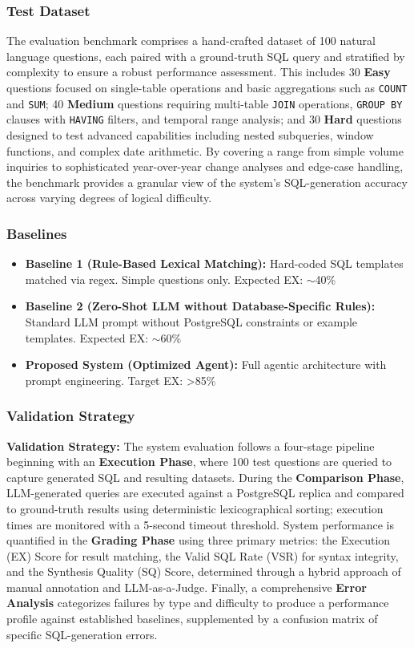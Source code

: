 \documentclass{article}
\begin{document}
\subsubsection{Test Dataset}
The evaluation benchmark comprises a hand-crafted dataset of 100 natural language questions, each paired with a ground-truth SQL query and stratified by complexity to ensure a robust performance assessment. This includes 30 \textbf{Easy} questions focused on single-table operations and basic aggregations such as \texttt{COUNT} and \texttt{SUM}; 40 \textbf{Medium} questions requiring multi-table \texttt{JOIN} operations, \texttt{GROUP BY} clauses with \texttt{HAVING} filters, and temporal range analysis; and 30 \textbf{Hard} questions designed to test advanced capabilities including nested subqueries, window functions, and complex date arithmetic. By covering a range from simple volume inquiries to sophisticated year-over-year change analyses and edge-case handling, the benchmark provides a granular view of the system's SQL-generation accuracy across varying degrees of logical difficulty.

\subsubsection{Baselines}
\begin{itemize}
  \item \textbf{Baseline 1 (Rule-Based Lexical Matching):} Hard-coded SQL templates matched via regex. Simple questions only. Expected EX: $\sim$40\%
  \item \textbf{Baseline 2 (Zero-Shot LLM without Database-Specific Rules):} Standard LLM prompt without PostgreSQL constraints or example templates. Expected EX: $\sim$60\%
  \item \textbf{Proposed System (Optimized Agent):} Full agentic architecture with prompt engineering. Target EX: >85\%
\end{itemize}

\subsubsection{Validation Strategy}
\noindent \textbf{Validation Strategy:} The system evaluation follows a four-stage pipeline beginning with an \textbf{Execution Phase}, where 100 test questions are queried to capture generated SQL and resulting datasets. During the \textbf{Comparison Phase}, LLM-generated queries are executed against a PostgreSQL replica and compared to ground-truth results using deterministic lexicographical sorting; execution times are monitored with a 5-second timeout threshold. System performance is quantified in the \textbf{Grading Phase} using three primary metrics: the Execution (EX) Score for result matching, the Valid SQL Rate (VSR) for syntax integrity, and the Synthesis Quality (SQ) Score, determined through a hybrid approach of manual annotation and LLM-as-a-Judge. Finally, a comprehensive \textbf{Error Analysis} categorizes failures by type and difficulty to produce a performance profile against established baselines, supplemented by a confusion matrix of specific SQL-generation errors.
\end{document}
